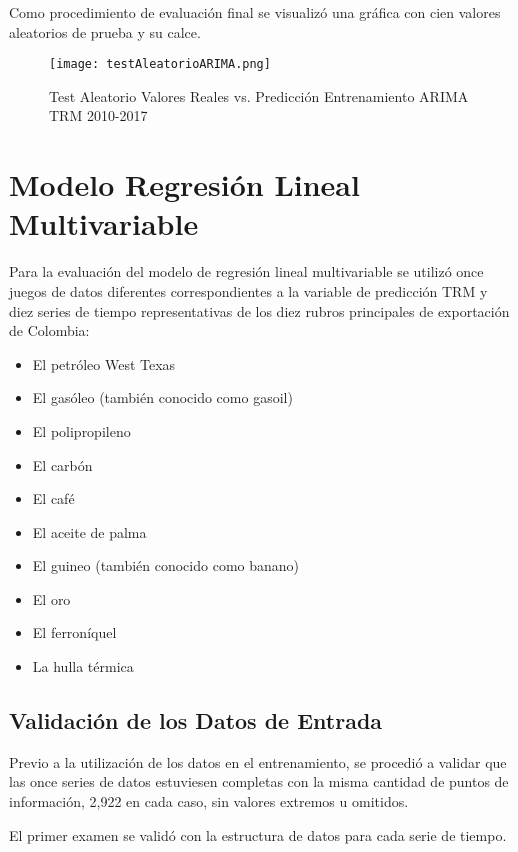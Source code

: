 Como procedimiento de evaluación final se visualizó una gráfica con cien valores aleatorios de prueba y su calce. 
\begin{figure}[H]
    \centering
    \texttt{[image: testAleatorioARIMA.png]}
    \caption{Test Aleatorio Valores Reales vs. Predicción Entrenamiento ARIMA TRM 2010-2017}
\end{figure}   

\section{Modelo Regresión Lineal Multivariable}
Para la evaluación del modelo de regresión lineal multivariable se utilizó once juegos de datos diferentes correspondientes a la variable de predicción TRM y diez series de tiempo representativas de los diez rubros principales de exportación de Colombia: 

\begin{itemize}
  \item El petróleo West Texas
  \item El gasóleo (también conocido como gasoil)
  \item El polipropileno
  \item El carbón
  \item El café
  \item El aceite de palma
  \item El guineo (también conocido como banano)
  \item El oro
  \item El ferroníquel
  \item La hulla térmica
\end{itemize}

\subsection{Validación de los Datos de Entrada}
Previo a la utilización de los datos en el entrenamiento, se procedió a validar que las once series de datos estuviesen completas con la misma cantidad de puntos de información, 2,922 en cada caso, sin valores extremos u omitidos. 

El primer examen se validó con la estructura de datos para cada serie de tiempo. 

